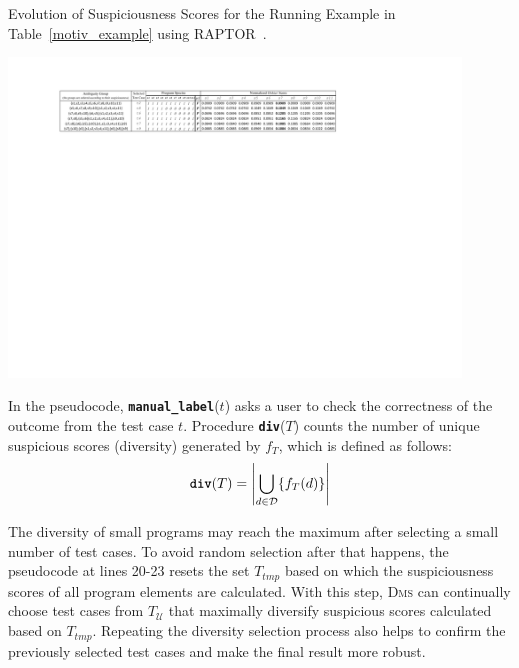 \begin{table}[!htbp]
    \centering
	\caption{Evolution of Suspiciousness Scores for the Running Example in Table~\ref{motiv_example} using RAPTOR~\citep{Alberto2011}.}
    \includegraphics[width=12cm]{ag_table.pdf}
    \label{tab:ag_evo}
\end{table}



In the pseudocode, \texttt{\textbf{manual\_label}}($t$) asks a user to check
the correctness of the outcome from the test case $t$. Procedure \texttt{\textbf{div}}($T$)
counts the number of unique suspicious scores (diversity) generated by $f_T$, which is defined as follows:
\begin{equation}
	\texttt{\textbf{div}}(T) = \left| \bigcup\limits_{d \in \mathcal{D}} \{f_{T}(d)\} \right|
\end{equation}

The diversity of small programs may reach the maximum after selecting a small number of test cases. To avoid random selection
after that happens, the pseudocode at lines 20-23 resets the set $T_{tmp}$
based on which the suspiciousness scores of all program elements are calculated. With this step, \textsc{Dms} can
continually choose test cases from $T_{\mathcal{U}}$ that maximally diversify suspicious scores calculated based on $T_{tmp}$.
Repeating the diversity selection process also helps to confirm the previously selected test cases and make the final result more robust.


